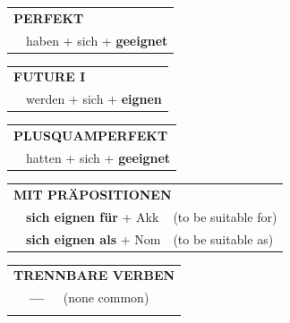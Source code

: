 \documentclass[10pt,a4paper]{revtex4-2}
\begin{document}
\begin{verbbox}
 \begin{tabular}{rl}
     \multicolumn{2}{l}{\textbf{PERFEKT}}\\
   & haben + sich + \textbf{geeignet}\\
  \end{tabular}
\hfill
   \begin{tabular}{rl}
    \multicolumn{2}{l}{\textbf{FUTURE I} }\\
   & werden + sich + \textbf{eignen}\\
  \end{tabular}
\hfill
   \begin{tabular}{rl}
      \multicolumn{2}{l}{\textbf{PLUSQUAMPERFEKT}}\\
   & hatten + sich + \textbf{geeignet}\\
  \end{tabular}

   \vspace{10pt}

   \begin{tabular}{lll}
      \multicolumn{3}{l}{\textbf{MIT PRÄPOSITIONEN}}\\
& \textbf{sich eignen für} + Akk & (to be suitable for)\\
& \textbf{sich eignen als} + Nom & (to be suitable as)\\
\end{tabular}
  \hfill
   \begin{tabular}{lll}
      \multicolumn{3}{l}{\textbf{TRENNBARE VERBEN}}\\
 & \textbf{---} & (none common)\\
\vspace{10pt}
  \end{tabular}

  \vspace{-5pt}

\end{verbbox}
\end{document}
